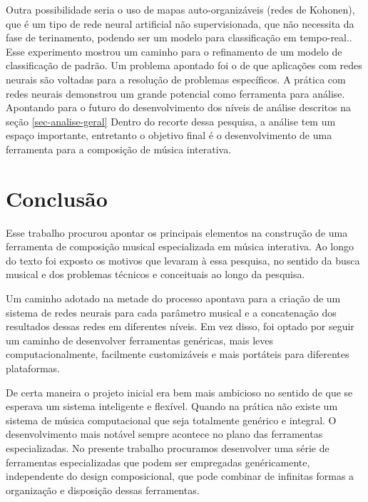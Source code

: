 \documentclass[draft]{ppgmus}
\begin{document}
Outra possibilidade seria o uso de mapas auto-organizáveis (redes de Kohonen), que é
um tipo de rede neural artificial não supervisionada, que não necessita
da fase de terinamento, podendo ser um modelo para classificação em tempo-real..
Esse experimento mostrou um caminho para o refinamento de um modelo de classificação de padrão.
Um problema apontado foi o de que aplicações com redes neurais são voltadas
para a resolução de problemas específicos.
A prática com redes neurais demonstrou um grande potencial como ferramenta para análise. Apontando
para o futuro do desenvolvimento dos níveis de análise descritos na seção \ref{sec-analise-geral}
Dentro do recorte dessa pesquisa, a análise tem um espaço importante, entretanto o objetivo
final é o desenvolvimento de uma ferramenta para a composição de música interativa.









\section{Conclusão}


Esse trabalho procurou apontar os principais elementos na construção
de uma ferramenta de composição musical especializada em música 
interativa. Ao longo do texto foi exposto os motivos que levaram
à essa pesquisa, no sentido da busca musical e dos problemas
técnicos e conceituais ao longo da pesquisa.

 Um caminho adotado na metade do
processo apontava para a criação de um sistema de redes neurais 
para cada parâmetro musical e a concatenação dos resultados dessas redes
em diferentes níveis. Em vez disso, foi optado por seguir um caminho
de desenvolver ferramentas genéricas, mais leves computacionalmente,
facilmente customizáveis e mais portáteis para diferentes plataformas.

De certa maneira o projeto inicial era bem mais ambicioso no sentido
de que se esperava um sistema inteligente e flexível. 
Quando na prática
não existe um sistema de música computacional que seja totalmente genérico
e integral. O desenvolvimento mais notável sempre acontece no plano das ferramentas
especializadas. No presente trabalho procuramos desenvolver uma série
de ferramentas especializadas que podem ser empregadas genéricamente, independente
do design composicional, que pode combinar de infinitas formas a organização e 
disposição dessas ferramentas.  
\end{document}
